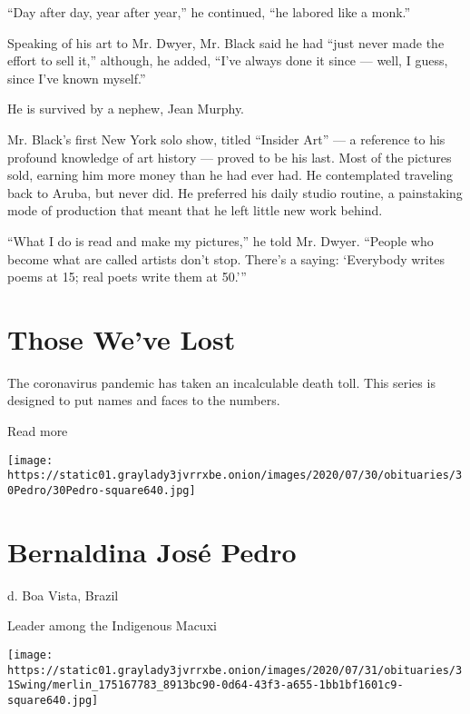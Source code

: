 ``Day after day, year after year,'' he continued, ``he labored like a
monk.''

Speaking of his art to Mr. Dwyer, Mr. Black said he had ``just never
made the effort to sell it,'' although, he added, ``I've always done it
since --- well, I guess, since I've known myself.''

He is survived by a nephew, Jean Murphy.

Mr. Black's first New York solo show, titled ``Insider Art'' --- a
reference to his profound knowledge of art history --- proved to be his
last. Most of the pictures sold, earning him more money than he had ever
had. He contemplated traveling back to Aruba, but never did. He
preferred his daily studio routine, a painstaking mode of production
that meant that he left little new work behind.

``What I do is read and make my pictures,'' he told Mr. Dwyer. ``People
who become what are called artists don't stop. There's a saying:
`Everybody writes poems at 15; real poets write them at 50.'''

\href{https://www.nytimes3xbfgragh.onion/interactive/2020/obituaries/people-died-coronavirus-obituaries.html?action=click\&pgtype=Article\&state=default\&region=BELOW_MAIN_CONTENT\&context=covid_obits_promo}{}

\hypertarget{those-weve-lost}{%
\section{Those We've Lost}\label{those-weve-lost}}

The coronavirus pandemic has taken an incalculable death toll. This
series is designed to put names and faces to the numbers.

Read more

\texttt{[image: https://static01.graylady3jvrrxbe.onion/images/2020/07/30/obituaries/30Pedro/30Pedro-square640.jpg]}

\hypertarget{bernaldina-josuxe9-pedro}{%
\section{Bernaldina José Pedro}\label{bernaldina-josuxe9-pedro}}

d. Boa Vista, Brazil

Leader among the Indigenous Macuxi

\texttt{[image: https://static01.graylady3jvrrxbe.onion/images/2020/07/31/obituaries/31Swing/merlin\_175167783\_8913bc90-0d64-43f3-a655-1bb1bf1601c9-square640.jpg]}

